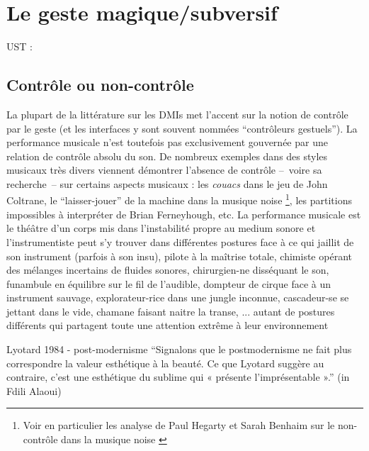 \section{Le geste magique/subversif}

\cite{cadoz_synthese_1981}

\cite{gibet_codage_1987}

\cite{cadoz_instrumental_1988}

\cite{delalande_geste_1988}

UST : \cite{delalande_les_1996}


\subsection{Contrôle ou non-contrôle}

\noindent La plupart de la littérature sur les \glspl{DMI} met l'accent sur la notion de contrôle par le geste (et les interfaces y sont souvent nommées ``contrôleurs gestuels''). La performance musicale n'est toutefois pas exclusivement gouvernée par une relation de contrôle absolu du son. De nombreux exemples dans des styles musicaux très divers viennent démontrer l'absence de contrôle --~voire sa recherche~-- sur certains aspects musicaux : les \textit{couacs} dans le jeu de John Coltrane, le ``laisser-jouer'' de la machine dans la musique noise \footnote{Voir en particulier les analyse de Paul Hegarty et Sarah Benhaim sur le non-contrôle dans la musique noise \cite{hegarty_noise_2007, benhaim_aux_2018}}, les partitions impossibles à interpréter de Brian Ferneyhough, etc. La performance musicale est le théâtre d'un corps mis dans l'instabilité propre au medium sonore et l'instrumentiste peut s'y trouver dans différentes postures face à ce qui jaillit de son instrument (parfois à son insu), pilote à la maîtrise totale, chimiste opérant des mélanges incertains de fluides sonores, chirurgien-ne disséquant le son, funambule en équilibre sur le fil de l'audible, dompteur de cirque face à un instrument sauvage, explorateur-rice dans une jungle inconnue, cascadeur-se se jettant dans le vide, chamane faisant naitre la transe, ... autant de postures différents qui partagent toute une attention extrême à leur environnement


Lyotard 1984 - post-modernisme ``Signalons que le postmodernisme ne fait plus correspondre la valeur esthétique à la beauté. Ce que Lyotard suggère au contraire, c’est une esthétique du sublime qui « présente l’imprésentable ».'' (in Fdili Alaoui)



